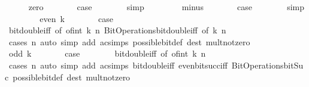 \begin{isabellebody}
\ \ \ \ \isamarkupfalse%
\ zero\isanewline
\ \ \ \ \isamarkupfalse%
\ \isamarkupfalse%
\ {\isacharquery}{\kern0pt}case\isanewline
\ \ \ \ \ \ \isamarkupfalse%
\ simp\isanewline
\ \ \isamarkupfalse%
\isanewline
\ \ \ \ \isamarkupfalse%
\ minus\isanewline
\ \ \ \ \isamarkupfalse%
\ \isamarkupfalse%
\ {\isacharquery}{\kern0pt}case\isanewline
\ \ \ \ \ \ \isamarkupfalse%
\ simp\isanewline
\ \ \isamarkupfalse%
\isanewline
\ \ \ \ \isamarkupfalse%
\ {\isacharparenleft}{\kern0pt}even\ k{\isacharparenright}{\kern0pt}\isanewline
\ \ \ \ \isamarkupfalse%
\ \isamarkupfalse%
\ {\isacharquery}{\kern0pt}case\isanewline
\ \ \ \ \ \ \isamarkupfalse%
\ bit{\isacharunderscore}{\kern0pt}double{\isacharunderscore}{\kern0pt}iff\ {\isacharbrackleft}{\kern0pt}of\ {\isacartoucheopen}of{\isacharunderscore}{\kern0pt}int\ k{\isacartoucheclose}\ n{\isacharbrackright}{\kern0pt}\ Bit{\isacharunderscore}{\kern0pt}Operations{\isachardot}{\kern0pt}bit{\isacharunderscore}{\kern0pt}double{\isacharunderscore}{\kern0pt}iff\ {\isacharbrackleft}{\kern0pt}of\ k\ n{\isacharbrackright}{\kern0pt}\isanewline
\ \ \ \ \ \ \isamarkupfalse%
\ {\isacharparenleft}{\kern0pt}cases\ n{\isacharparenright}{\kern0pt}\ {\isacharparenleft}{\kern0pt}auto\ simp\ add{\isacharcolon}{\kern0pt}\ ac{\isacharunderscore}{\kern0pt}simps\ possible{\isacharunderscore}{\kern0pt}bit{\isacharunderscore}{\kern0pt}def\ dest{\isacharcolon}{\kern0pt}\ mult{\isacharunderscore}{\kern0pt}not{\isacharunderscore}{\kern0pt}zero{\isacharparenright}{\kern0pt}\isanewline
\ \ \isamarkupfalse%
\isanewline
\ \ \ \ \isamarkupfalse%
\ {\isacharparenleft}{\kern0pt}odd\ k{\isacharparenright}{\kern0pt}\isanewline
\ \ \ \ \isamarkupfalse%
\ \isamarkupfalse%
\ {\isacharquery}{\kern0pt}case\isanewline
\ \ \ \ \ \ \isamarkupfalse%
\ bit{\isacharunderscore}{\kern0pt}double{\isacharunderscore}{\kern0pt}iff\ {\isacharbrackleft}{\kern0pt}of\ {\isacartoucheopen}of{\isacharunderscore}{\kern0pt}int\ k{\isacartoucheclose}\ n{\isacharbrackright}{\kern0pt}\isanewline
\ \ \ \ \ \ \isamarkupfalse%
\ {\isacharparenleft}{\kern0pt}cases\ n{\isacharparenright}{\kern0pt}\ {\isacharparenleft}{\kern0pt}auto\ simp\ add{\isacharcolon}{\kern0pt}\ ac{\isacharunderscore}{\kern0pt}simps\ bit{\isacharunderscore}{\kern0pt}double{\isacharunderscore}{\kern0pt}iff\ even{\isacharunderscore}{\kern0pt}bit{\isacharunderscore}{\kern0pt}succ{\isacharunderscore}{\kern0pt}iff\ Bit{\isacharunderscore}{\kern0pt}Operations{\isachardot}{\kern0pt}bit{\isacharunderscore}{\kern0pt}Suc\ possible{\isacharunderscore}{\kern0pt}bit{\isacharunderscore}{\kern0pt}def\ dest{\isacharcolon}{\kern0pt}\ mult{\isacharunderscore}{\kern0pt}not{\isacharunderscore}{\kern0pt}zero{\isacharparenright}{\kern0pt}\isanewline

\end{isabellebody}
